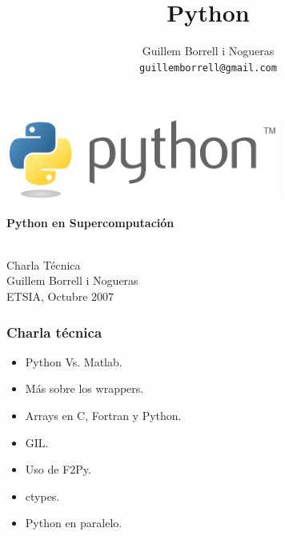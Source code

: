 \documentclass{beamer}
\title{Python}
\author{
Guillem Borrell i Nogueras\\
\texttt{guillemborrell@gmail.com}
}
\begin{document}
\begin{frame}
\begin{center}
 \includegraphics[width=9cm]{files/python-logo-generic.pdf}\\
\begin{large}
\textbf{Python en Supercomputación}
\end{large}\\
Charla Técnica\\

Guillem Borrell i Nogueras\\

ETSIA, Octubre 2007
\end{center}

\end{frame}

\begin{frame}
 \frametitle{Charla técnica}
\begin{itemize}
 \item Python Vs. Matlab.
 \item Más sobre los wrappers.
 \item Arrays en C, Fortran y Python.
 \item GIL.
 \item Uso de F2Py.
 \item ctypes.
 \item Python en paralelo.
\end{itemize}

\end{frame}
\end{document}
